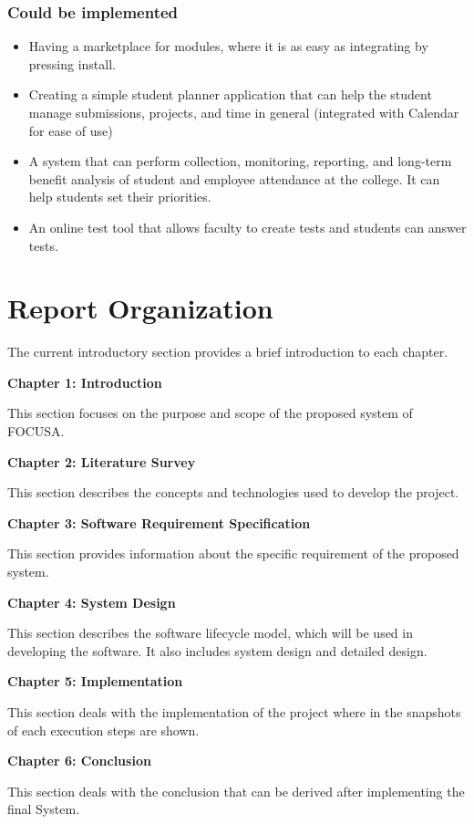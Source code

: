 \subsubsection{Could be implemented}
\begin{itemize}
    \item Having a marketplace for modules, where it is as easy as integrating by pressing install.
    \item Creating a simple student planner application that can help the student manage submissions, 
    projects, and time in general (integrated with Calendar for ease of use)
    \item A system that can perform collection, monitoring, reporting, and long-term benefit analysis 
    of student and employee attendance at the college. It can help students set their priorities.
    \item An online test tool that allows faculty to create tests and students can answer tests.
\end{itemize}

\section{Report Organization}

The current introductory section provides a brief introduction to each chapter.

\textbf{Chapter 1: Introduction}

This section focuses on the purpose and scope of the proposed system of FOCUSA.

\textbf{Chapter 2: Literature Survey}

This section describes the concepts and technologies used to develop the project.

\textbf{Chapter 3: Software Requirement Specification}

This section provides information about the specific requirement of the proposed system.

\textbf{Chapter 4: System Design}

This section describes the software lifecycle model, which will be used in developing the
software. It also includes system design and detailed design.

\textbf{Chapter 5: Implementation}

This section deals with the implementation of the project where in the snapshots of each execution steps are shown.

\textbf{Chapter 6: Conclusion}

This section deals with the conclusion that can be derived after implementing the final System.

